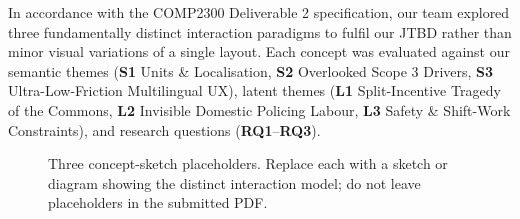 \documentclass[12pt, a4paper]{article}
\begin{document}
In accordance with the COMP2300 Deliverable 2 specification, our team explored three fundamentally distinct interaction paradigms to fulfil our JTBD rather than minor visual variations of a single layout. Each concept was evaluated against our semantic themes (\textbf{S1} Units \& Localisation, \textbf{S2} Overlooked Scope 3 Drivers, \textbf{S3} Ultra-Low-Friction Multilingual UX), latent themes (\textbf{L1} Split-Incentive Tragedy of the Commons, \textbf{L2} Invisible Domestic Policing Labour, \textbf{L3} Safety \& Shift-Work Constraints), and research questions (\textbf{RQ1}--\textbf{RQ3}).


\begin{figure}[H]
    \centering
    \begin{minipage}[t]{0.32\textwidth}
        \centering
        \caption*{A: Passive Ledger}
    \end{minipage}\hfill
    \begin{minipage}[t]{0.32\textwidth}
        \centering
        \caption*{B: Social Kiosk}
    \end{minipage}\hfill
    \begin{minipage}[t]{0.32\textwidth}
        \centering
        \caption*{C: Hybrid Simulator}
    \end{minipage}
    \caption{Three concept-sketch placeholders. Replace each with a sketch or diagram showing the distinct interaction model; do not leave placeholders in the submitted PDF.}
    \label{fig:concept-sketches}
\end{figure}
\end{document}
